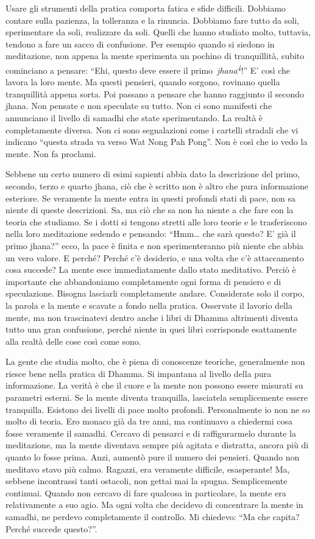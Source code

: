Usare gli strumenti della pratica comporta fatica e sfide difficili.
Dobbiamo contare sulla pazienza, la tolleranza e la rinuncia. Dobbiamo
fare tutto da soli, sperimentare da soli, realizzare da soli. Quelli che
hanno studiato molto, tuttavia, tendono a fare un sacco di confusione.
Per esempio quando si siedono in meditazione, non appena la mente
sperimenta un pochino di tranquillità, subito cominciano a pensare:
``Ehi, questo deve essere il primo~\emph{jhana\textsuperscript{4}}!'' E'
così che lavora la loro mente. Ma questi pensieri, quando sorgono,
rovinano quella tranquillità appena sorta. Poi passano a pensare che
hanno raggiunto il secondo jhana. Non pensate e non speculate su tutto.
Non ci sono manifesti che annunciano il livello di samadhi che state
sperimentando. La realtà è completamente diversa. Non ci sono
segnalazioni come i cartelli stradali che vi indicano ``questa strada va
verso Wat Nong Pah Pong''. Non è così che io vedo la mente. Non fa
proclami.

Sebbene un certo numero di esimi sapienti abbia dato la descrizione del
primo, secondo, terzo e quarto jhana, ciò che è scritto non è altro che
pura informazione esteriore. Se veramente la mente entra in questi
profondi stati di pace, non sa niente di queste descrizioni. Sa, ma ciò
che sa non ha niente a che fare con la teoria che studiamo. Se i dotti
si tengono stretti alle loro teorie e le trasferiscono nella loro
meditazione sedendo e pensando: ``Hmm\ldots{} che sarà questo? E' già il
primo jhana?'' ecco, la pace è finita e non sperimenteranno più niente
che abbia un vero valore. E perché? Perché c'è desiderio, e una volta
che c'è attaccamento cosa succede? La mente esce immediatamente dallo
stato meditativo. Perciò è importante che abbandoniamo completamente
ogni forma di pensiero e di speculazione. Bisogna lasciarli
completamente andare. Considerate solo il corpo, la parola e la mente e
scavate a fondo nella pratica. Osservate il lavorio della mente, ma non
trascinatevi dentro anche i libri di Dhamma altrimenti diventa tutto una
gran confusione, perché niente in quei libri corrisponde esattamente
alla realtà delle cose così come sono.

La gente che studia molto, che è piena di conoscenze teoriche,
generalmente non riesce bene nella pratica di Dhamma. Si impantana al
livello della pura informazione. La verità è che il cuore e la mente non
possono essere misurati su parametri esterni. Se la mente diventa
tranquilla, lasciatela semplicemente essere tranquilla. Esistono dei
livelli di pace molto profondi. Personalmente io non ne so molto di
teoria. Ero monaco già da tre anni, ma continuavo a chiedermi cosa fosse
veramente il samadhi. Cercavo di pensarci e di raffigurarmelo durante la
meditazione, ma la mente diventava sempre più agitata e distratta,
ancora più di quanto lo fosse prima. Anzi, aumentò pure il numero dei
pensieri. Quando non meditavo stavo più calmo. Ragazzi, era veramente
difficile, esasperante! Ma, sebbene incontrassi tanti ostacoli, non
gettai mai la spugna. Semplicemente continuai. Quando non cercavo di
fare qualcosa in particolare, la mente era relativamente a suo agio. Ma
ogni volta che decidevo di concentrare la mente in samadhi, ne perdevo
completamente il controllo. Mi chiedevo: ``Ma che capita? Perché succede
questo?''.

